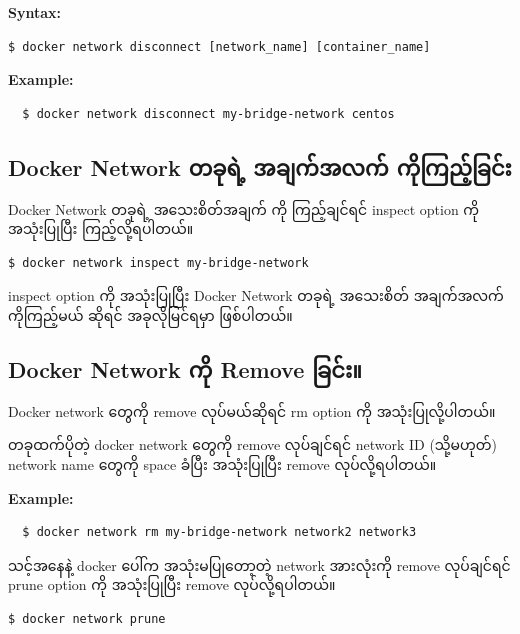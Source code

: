 \documentclass{article}
\begin{document}
\textbf{Syntax:}

\begin{verbatim}
$ docker network disconnect [network_name] [container_name]
\end{verbatim}

\textbf{Example:}

\begin{verbatim}
  $ docker network disconnect my-bridge-network centos
\end{verbatim}

\subsection{Docker Network တခုရဲ့ အချက်အလက်
ကိုကြည့်ခြင်း}\label{docker-network-ux1010ux1001ux101b-ux1021ux1001ux1000ux1021ux101cux1000-ux1000ux1000ux100aux1001ux1004}

Docker Network တခုရဲ့ အသေးစိတ်အချက် ကို ကြည့်ချင်ရင် inspect option ကို
အသုံးပြုပြီး ကြည့်လို့ရပါတယ်။

\begin{verbatim}
$ docker network inspect my-bridge-network
\end{verbatim}

inspect option ကို အသုံးပြုပြီး Docker Network တခုရဲ့ အသေးစိတ်
အချက်အလက်ကိုကြည့်မယ် ဆိုရင် အခုလိုမြင်ရမှာ ဖြစ်ပါတယ်။

\subsection{Docker Network ကို Remove
ခြင်း။}\label{docker-network-ux1000-remove-ux1001ux1004}

Docker network တွေကို remove လုပ်မယ်ဆိုရင် rm option ကို
အသုံးပြုလို့ပါတယ်။

တခုထက်ပိုတဲ့ docker network တွေကို remove လုပ်ချင်ရင် network ID
(သို့မဟုတ်) network name တွေကို space ခံပြီး အသုံးပြုပြီး remove
လုပ်လို့ရပါတယ်။

\textbf{Example:}

\begin{verbatim}
  $ docker network rm my-bridge-network network2 network3
\end{verbatim}

သင့်အနေနဲ့ docker ပေါ်က အသုံးမပြုတော့တဲ့ network အားလုံးကို remove
လုပ်ချင်ရင် prune option ကို အသုံးပြုပြီး remove လုပ်လို့ရပါတယ်။

\begin{verbatim}
$ docker network prune
\end{verbatim}
\end{document}
